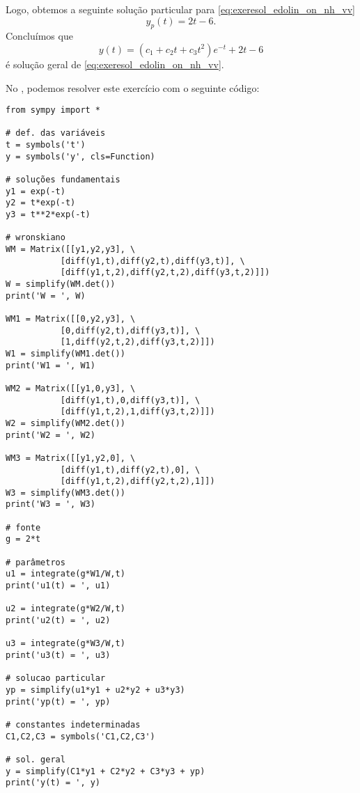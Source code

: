 \begin{resol}
  Logo, obtemos a seguinte solução particular para \eqref{eq:exeresol_edolin_on_nh_vv}
  \begin{equation}
    y_p(t) = 2t - 6.
  \end{equation}
  Concluímos que
  \begin{equation}
    y(t) = (c_1 + c_2t + c_3t^2)e^{-t} + 2t - 6
  \end{equation}
  é solução geral de \eqref{eq:exeresol_edolin_on_nh_vv}.

  \ifispython
  No \python, podemos resolver este exercício com o seguinte código:
\begin{verbatim}
from sympy import *

# def. das variáveis
t = symbols('t')
y = symbols('y', cls=Function)

# soluções fundamentais
y1 = exp(-t)
y2 = t*exp(-t)
y3 = t**2*exp(-t)

# wronskiano
WM = Matrix([[y1,y2,y3], \
           [diff(y1,t),diff(y2,t),diff(y3,t)], \
           [diff(y1,t,2),diff(y2,t,2),diff(y3,t,2)]])
W = simplify(WM.det())
print('W = ', W)

WM1 = Matrix([[0,y2,y3], \
           [0,diff(y2,t),diff(y3,t)], \
           [1,diff(y2,t,2),diff(y3,t,2)]])
W1 = simplify(WM1.det())
print('W1 = ', W1)

WM2 = Matrix([[y1,0,y3], \
           [diff(y1,t),0,diff(y3,t)], \
           [diff(y1,t,2),1,diff(y3,t,2)]])
W2 = simplify(WM2.det())
print('W2 = ', W2)

WM3 = Matrix([[y1,y2,0], \
           [diff(y1,t),diff(y2,t),0], \
           [diff(y1,t,2),diff(y2,t,2),1]])
W3 = simplify(WM3.det())
print('W3 = ', W3)

# fonte
g = 2*t

# parâmetros
u1 = integrate(g*W1/W,t)
print('u1(t) = ', u1)

u2 = integrate(g*W2/W,t)
print('u2(t) = ', u2)

u3 = integrate(g*W3/W,t)
print('u3(t) = ', u3)

# solucao particular
yp = simplify(u1*y1 + u2*y2 + u3*y3)
print('yp(t) = ', yp)

# constantes indeterminadas
C1,C2,C3 = symbols('C1,C2,C3')

# sol. geral
y = simplify(C1*y1 + C2*y2 + C3*y3 + yp)
print('y(t) = ', y)
\end{verbatim}
\end{resol}

